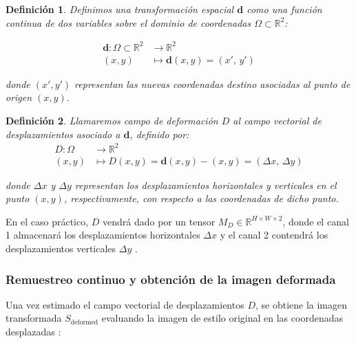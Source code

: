 \documentclass[a4paper]{article}
\newtheorem{definicion}{Definición}[section]
\begin{document}
\begin{definicion}
Definimos una transformación espacial $\mathbf{d}$ como una función continua de dos variables sobre el dominio de coordenadas $\Omega \subset \mathbb{R}^2$:

\[
\begin{aligned}
\mathbf{d} : \Omega \subset \mathbb{R}^2 &\longrightarrow \mathbb{R}^2 \\
(x, y) &\longmapsto \mathbf{d}(x, y) = \left( x', \, y' \right)
\end{aligned}
\]

\noindent donde $(x', y')$ representan las nuevas coordenadas destino asociadas al punto de origen $(x, y)$.
\end{definicion}

\vspace{0.3cm}

\begin{definicion}
Llamaremos campo de deformación $D$ al campo vectorial de desplazamientos asociado a $\mathbf{d}$, definido por:
\[
\begin{aligned}
D : \Omega &\longrightarrow \mathbb{R}^2 \\
(x, y) &\longmapsto D(x, y) = \mathbf{d}(x, y) - (x, y) = \left( \Delta x, \, \Delta y \right)
\end{aligned}
\]

\noindent donde $\Delta x$ y $\Delta y$ representan los desplazamientos horizontales y verticales en el punto $(x, y)$, respectivamente, con respecto a las coordenadas de dicho punto.
\end{definicion}

\vspace{0.3cm}

\noindent En el caso práctico, $D$ vendrá dado por un tensor $M_D \in \mathbb{R}^{H \times W \times 2}$, donde el canal 1 almacenará los desplazamientos horizontales $\Delta x$ y el canal 2 contendrá los desplazamientos verticales $\Delta y$ \cite{zamzam2025pixelshuffler}.

\subsubsection{Remuestreo continuo y obtención de la imagen deformada}

\noindent Una vez estimado el campo vectorial de desplazamientos $D$, se obtiene la imagen transformada $S_{\text{deformed}}$ evaluando la imagen de estilo original en las coordenadas desplazadas \cite{zamzam2025pixelshuffler}:
\end{document}
